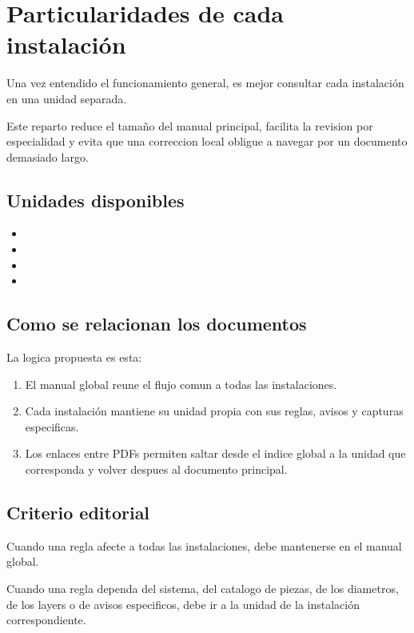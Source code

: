 ﻿\section{Particularidades de cada instalaci\'on}

Una vez entendido el funcionamiento general, es mejor consultar cada instalaci\'on en una unidad separada.

Este reparto reduce el tama\~no del manual principal, facilita la revision por especialidad y evita que una correccion local obligue a navegar por un documento demasiado largo.

\subsection{Unidades disponibles}

\begin{itemize}
\item {}
\item {}
\item {}
\item {}
\end{itemize}

\subsection{Como se relacionan los documentos}

La logica propuesta es esta:

\begin{enumerate}
\item El manual global reune el flujo comun a todas las instalaciones.
\item Cada instalaci\'on mantiene su unidad propia con sus reglas, avisos y capturas especificas.
\item Los enlaces entre PDFs permiten saltar desde el indice global a la unidad que corresponda y volver despues al documento principal.
\end{enumerate}

\subsection{Criterio editorial}

Cuando una regla afecte a todas las instalaciones, debe mantenerse en el manual global.

Cuando una regla dependa del sistema, del catalogo de piezas, de los diametros, de los layers o de avisos especificos, debe ir a la unidad de la instalaci\'on correspondiente.
